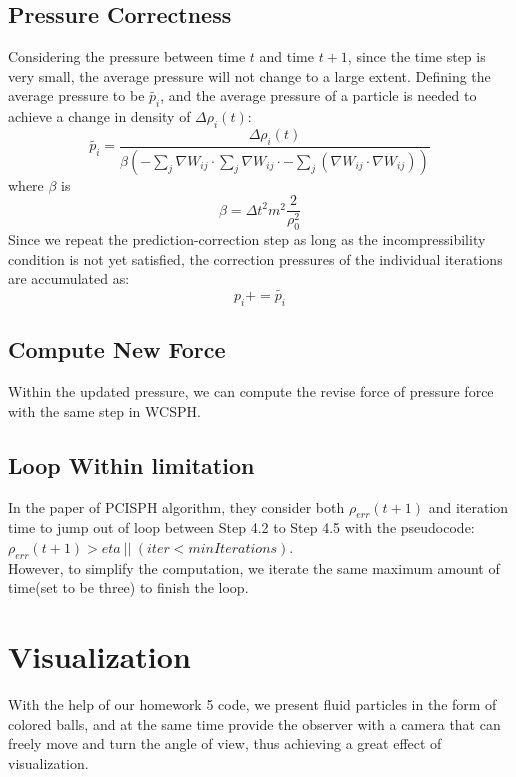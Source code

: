 \documentclass[acmtog]{acmart}
\begin{document}
\subsection{Pressure Correctness}
Considering the pressure between time $t$ and time $t+1$, since the time step is very small, the average pressure will not change to a large extent. Defining the average pressure to be $\tilde{p_i}$, and the average pressure of a particle is needed to achieve a change in density of $\Delta \rho_i(t)$:
\begin{equation*}
	\tilde{p_i}=\frac{\Delta \rho_i(t)}{\beta(-\sum_j\nabla W_{ij}\cdot \sum_j\nabla W_{ij}\cdot-\sum_j(\nabla W_{ij}\cdot \nabla W_{ij}))}
\end{equation*}
where $\beta$ is
\begin{equation*}
	\beta=\Delta t^2 m^2 \frac{2}{\rho_0^2}
\end{equation*}
Since we repeat the prediction-correction step as long as the incompressibility condition is not yet satisfied, the correction pressures of the individual iterations are accumulated as:
\begin{equation*}
	p_i+=\tilde{p_i}
\end{equation*}

\subsection{Compute New Force}
Within the updated pressure, we can compute the revise force of pressure force with the same step in WCSPH.

\subsection{Loop Within limitation}
In the paper of PCISPH algorithm, they consider both $\rho_{err}(t+1)$ and iteration time to jump out of loop between Step 4.2 to Step 4.5 with the pseudocode: $\rho_{err}(t+1) > eta\ ||\ (iter < minIterations)$.\\ However, to simplify the computation, we iterate the same maximum amount of time(set to be three) to finish the loop.

\section{Visualization}
With the help of our homework 5 code, we present fluid particles in the form of colored balls, and at the same time provide the observer with a camera that can freely move and turn the angle of view, thus achieving a great effect of visualization.
\end{document}
